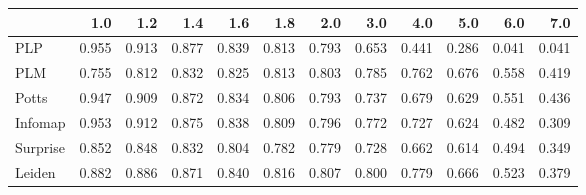 \begin{tabular}{lrrrrrrrrrrr}
\toprule
{} &   1.0 &   1.2 &   1.4 &   1.6 &   1.8 &   2.0 &   3.0 &   4.0 &   5.0 &   6.0 &   7.0 \\
\midrule
PLP      & 0.955 & 0.913 & 0.877 & 0.839 & 0.813 & 0.793 & 0.653 & 0.441 & 0.286 & 0.041 & 0.041 \\
PLM      & 0.755 & 0.812 & 0.832 & 0.825 & 0.813 & 0.803 & 0.785 & 0.762 & 0.676 & 0.558 & 0.419 \\
Potts    & 0.947 & 0.909 & 0.872 & 0.834 & 0.806 & 0.793 & 0.737 & 0.679 & 0.629 & 0.551 & 0.436 \\
Infomap  & 0.953 & 0.912 & 0.875 & 0.838 & 0.809 & 0.796 & 0.772 & 0.727 & 0.624 & 0.482 & 0.309 \\
Surprise & 0.852 & 0.848 & 0.832 & 0.804 & 0.782 & 0.779 & 0.728 & 0.662 & 0.614 & 0.494 & 0.349 \\
Leiden   & 0.882 & 0.886 & 0.871 & 0.840 & 0.816 & 0.807 & 0.800 & 0.779 & 0.666 & 0.523 & 0.379 \\
\bottomrule
\end{tabular}
